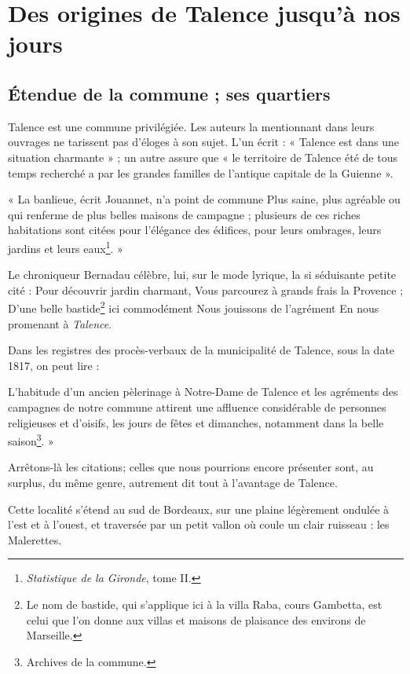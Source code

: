 \chapter{Des origines de Talence jusqu'à nos jours}

\section{Étendue de la commune ; ses quartiers}

Talence est une commune privilégiée. Les auteurs la mentionnant dans leurs ouvrages ne tarissent pas d'éloges à son sujet. L'un écrit : « Talence est dans une situation charmante » ; un autre assure que « le territoire de Talence été de tous temps recherché a par les grandes familles de l'antique capitale de la Guienne ».

« La banlieue, écrit Jouannet, n'a point de commune Plus saine, plus agréable ou qui renferme de plus belles maisons de campagne ; plusieurs de ces riches habitations sont citées pour l'élégance des édifices, pour leurs ombrages, leurs jardins et leurs eaux\footnote{\textit{Statistique de la Gironde}, tome II.}. »

Le chroniqueur Bernadau célèbre, lui, sur le mode lyrique, la si séduisante petite cité : 
Pour découvrir jardin charmant, 
Vous parcourez à grands frais la Provence ; 
D'une belle bastide\footnote{Le nom de bastide, qui s'applique ici à la villa Raba, cours Gambetta, est celui que l'on donne aux villas et maisons de plaisance des environs de Marseille.} ici commodément 
Nous jouissons de l'agrément 
En nous promenant à \textit{Talence}. 

Dans les registres des procès-verbaux de la municipalité de Talence, sous la date 1817, on peut lire : 

L'habitude d'un ancien pèlerinage à Notre-Dame de Talence et les agréments des campagnes de notre commune attirent une affluence considérable de personnes religieuses et d'oisifs, les jours de fêtes et dimanches, notamment dans la belle saison\footnote{Archives de la commune.}. »

Arrêtons-là les citations; celles que nous pourrions encore présenter sont, au surplus, du même genre, autrement dit tout à l'avantage de Talence. 

Cette localité s'étend au sud de Bordeaux, sur une plaine légèrement ondulée à l'est et à l'ouest, et traversée par un petit vallon où coule un clair ruisseau : les Malerettes. 

